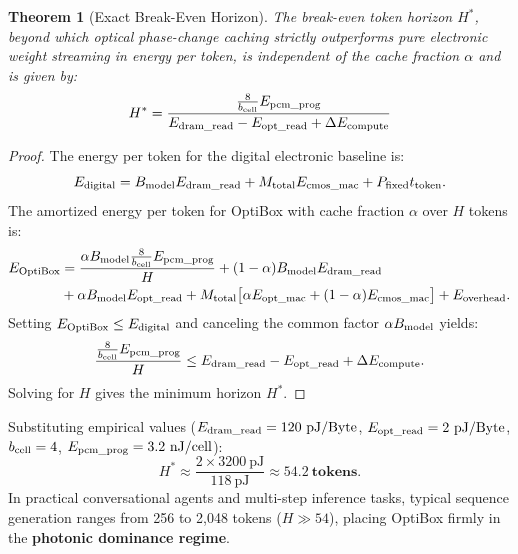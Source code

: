 \documentclass[11pt,a4paper]{report}
\newtheorem{theorem}{Theorem}[chapter]
\begin{document}
\begin{theorem}[Exact Break-Even Horizon]
The break-even token horizon $H^*$, beyond which optical phase-change caching strictly outperforms pure electronic weight streaming in energy per token, is independent of the cache fraction $\alpha$ and is given by:
\begin{equation}
H^* = \frac{\frac{8}{b_{\rm cell}} E_{\rm pcm\_prog}}{E_{\rm dram\_read} - E_{\rm opt\_read} + \Delta E_{\rm compute}}
\end{equation}
\end{theorem}
\begin{proof}
The energy per token for the digital electronic baseline is:
\begin{equation}
E_{\rm digital} = B_{\rm model} E_{\rm dram\_read} + M_{\rm total} E_{\rm cmos\_mac} + P_{\rm fixed} t_{\rm token}.
\end{equation}
The amortized energy per token for OptiBox with cache fraction $\alpha$ over $H$ tokens is:
\begin{align}
E_{\rm OptiBox} &= \frac{\alpha B_{\rm model} \frac{8}{b_{\rm cell}} E_{\rm pcm\_prog}}{H} + (1-\alpha) B_{\rm model} E_{\rm dram\_read} \nonumber \\
&+ \alpha B_{\rm model} E_{\rm opt\_read} + M_{\rm total} \big[ \alpha E_{\rm opt\_mac} + (1-\alpha) E_{\rm cmos\_mac} \big] + E_{\rm overhead}.
\end{align}
Setting $E_{\rm OptiBox} \le E_{\rm digital}$ and canceling the common factor $\alpha B_{\rm model}$ yields:
\begin{equation}
\frac{\frac{8}{b_{\rm cell}} E_{\rm pcm\_prog}}{H} \le E_{\rm dram\_read} - E_{\rm opt\_read} + \Delta E_{\rm compute}.
\end{equation}
Solving for $H$ gives the minimum horizon $H^*$.
\end{proof}

Substituting empirical values ($E_{\rm dram\_read} = 120~\text{pJ/Byte}$, $E_{\rm opt\_read} = 2~\text{pJ/Byte}$, $b_{\rm cell} = 4$, $E_{\rm pcm\_prog} = 3.2~\text{nJ/cell}$):
\begin{equation}
H^* \approx \frac{2 \times 3200~\text{pJ}}{118~\text{pJ}} \approx \mathbf{54.2~\text{tokens}}.
\end{equation}
In practical conversational agents and multi-step inference tasks, typical sequence generation ranges from 256 to 2,048 tokens ($H \gg 54$), placing OptiBox firmly in the \textbf{photonic dominance regime}.

\end{document}
